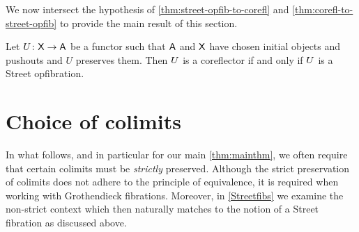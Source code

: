 \documentclass{amsart}
\begin{document}
We now intersect the hypothesis of \cref{thm:street-opfib-to-corefl} and \cref{thm:corefl-to-street-opfib} to provide the main result of this section.

\begin{thm}
  \label{thm:main-theorem-street-version}
  Let $ U \colon \mathsf{X} \to \mathsf{A} $ be a functor such that $ \mathsf{A} $ and $ \mathsf{X} $ have chosen initial objects and pushouts and $ U $ preserves them. Then $ U $ is a coreflector if and only if $ U $ is a Street opfibration.
\end{thm}





\appendix{}

\section{Choice of colimits}
\label{sec:choice_of_colimits}

In what follows, and in particular for our main \cref{thm:mainthm}, we often require that certain colimits must be \emph{strictly} preserved. Although the strict preservation of colimits does not adhere to the principle of equivalence, it is required when working with Grothendieck fibrations. Moreover, in \cref{Streetfibs} we examine the non-strict context which then naturally matches to the notion of a Street fibration as discussed above.
\end{document}
